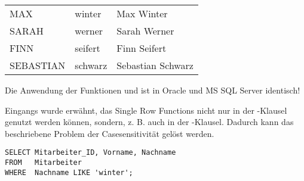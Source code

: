         \begin{center}
          \begin{small}
            \tablehead{}
            \tabletail {
            }
            \begin{oraclesql}
              \begin{supertabular}{lll}
                MAX & winter & Max Winter \\
                SARAH & werner & Sarah Werner \\
                FINN & seifert & Finn Seifert \\
                SEBASTIAN & schwarz & Sebastian Schwarz \\
              \end{supertabular}
            \end{oraclesql}
          \end{small}
        \end{center}
        \begin{merke}
          Die Anwendung der Funktionen  und  ist in Oracle und MS SQL Server identisch!
        \end{merke}
        Eingangs wurde erwähnt, das Single Row Functions nicht nur in der \SELECT-Klausel genutzt werden können, sondern, z. B. auch in der \WHERE-Klausel. Dadurch kann das beschriebene Problem der Casesensitivität gelöst werden.
        \begin{lstlisting}[language=oracle_sql,caption={Das Problem der Casesensitivität},label=sql03_02]
SELECT Mitarbeiter_ID, Vorname, Nachname
FROM   Mitarbeiter
WHERE  Nachname LIKE 'winter';
        \end{lstlisting}
